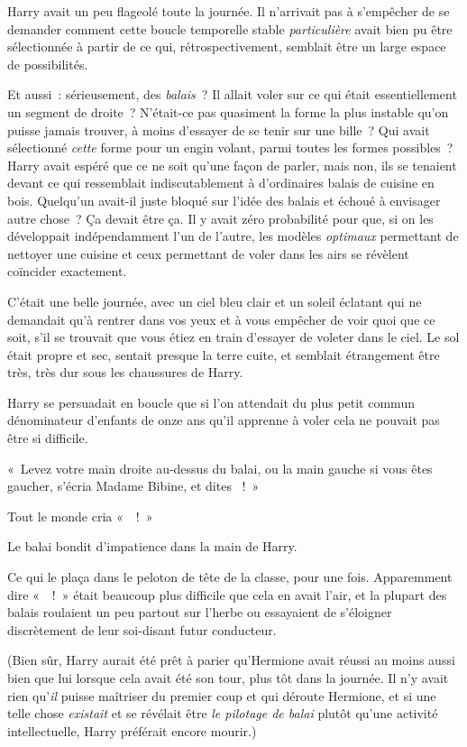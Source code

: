 Harry avait un peu flageolé toute la journée.
Il n'arrivait pas à s'empêcher de se demander comment cette boucle temporelle stable \emph{particulière} avait bien pu être sélectionnée à partir de ce qui, rétrospectivement, semblait être un large espace de possibilités.

Et aussi~: sérieusement, des \emph{balais}~?
Il allait voler sur ce qui était essentiellement un segment de droite~?
N'était-ce pas quasiment la forme la plus instable qu'on puisse jamais trouver, à moins d'essayer de se tenir sur une bille~?
Qui avait sélectionné \emph{cette} forme pour un engin volant, parmi toutes les formes possibles~?
Harry avait espéré que ce ne soit qu'une façon de parler, mais non, ils se tenaient devant ce qui ressemblait indiscutablement à d'ordinaires balais de cuisine en bois.
Quelqu'un avait-il juste bloqué sur l'idée des balais et échoué à envisager autre chose~?
Ça devait être ça.
Il y avait zéro probabilité pour que, si on les développait indépendamment l'un de l'autre, les modèles \emph{optimaux} permettant de nettoyer une cuisine et ceux permettant de voler dans les airs se révèlent coïncider exactement.

C'était une belle journée, avec un ciel bleu clair et un soleil éclatant qui ne demandait qu'à rentrer dans vos yeux et à vous empêcher de voir quoi que ce soit, s'il se trouvait que vous étiez en train d'essayer de voleter dans le ciel.
Le sol était propre et sec, sentait presque la terre cuite, et semblait étrangement être très, très dur sous les chaussures de Harry.

Harry se persuadait en boucle que si l'on attendait du plus petit commun dénominateur d'enfants de onze ans qu'il apprenne à voler cela ne pouvait pas être si difficile.

«~Levez votre main droite au-dessus du balai, ou la main gauche si vous êtes gaucher, s'écria Madame Bibine, et dites ~!~»

Tout le monde cria «~~!~»

Le balai bondit d'impatience dans la main de Harry.

Ce qui le plaça dans le peloton de tête de la classe, pour une fois.
Apparemment dire «~~!~»
était beaucoup plus difficile que cela en avait l'air, et la plupart des balais roulaient un peu partout sur l'herbe ou essayaient de s'éloigner discrètement de leur soi-disant futur conducteur.

(Bien sûr, Harry aurait été prêt à parier qu'Hermione avait réussi au moins aussi bien que lui lorsque cela avait été son tour, plus tôt dans la journée.
Il n'y avait rien qu'\emph{il} puisse maîtriser du premier coup et qui déroute Hermione, et si une telle chose \emph{existait} et se révélait être \emph{le pilotage de balai} plutôt qu'une activité intellectuelle, Harry préférait encore mourir.)

